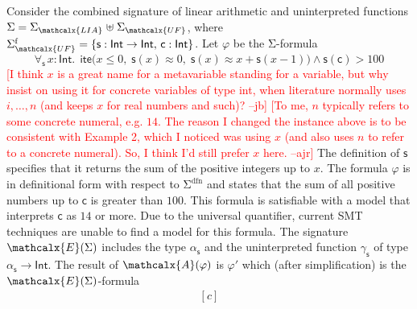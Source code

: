 \documentclass[runningheads,a4paper]{llncs}
\newcommand{\con}[1]{\mathsf{#1}}
\let\const=\con
\let\oldSigma=\Sigma
\def\Sigma{\mathrm{\oldSigma}}
\let\oldwedge=\wedge
\def\wedge{\mathrel{\oldwedge}}
\newcommand{\teq}{\approx}
\newcommand{\conv}{\mathcalx{A}}
\newcommand{\stypes}[1]{#1^\mathrm{ty}}
\newcommand{\sfuns}[1]{#1^\mathrm{f}}
\newcommand{\sfundefs}[1]{#1^\mathrm{dfn}}
\newcommand{\typeint}{\ty{Int}}
\newcommand\ty[1]{\con{#1}}
\newcommand{\lite}{\con{ite}}
\newcommand\concret{\gamma} %
\newcommand{\forallf}[1]{\forall_{\!#1\:}}
\newcommand{\farg}[1]{\concret_{#1}}
\newcommand{\fargtype}[1]{\alpha_{#1}}
\newcommand{\Sigmalia}{\Sigma_{\mathcalx{LIA}}}
\newcommand{\extendsig}[1]{\mathcalx{E}( #1 )}
\newcommand{\rem}[1]{\textcolor{red}{[#1]}}
\newcommand{\ajr}[1]{\rem{#1 --ajr}}
\newcommand{\jb}[1]{\rem{#1 --jb}}
\newcommand{\ct}[1]{\rem{#1 --ct}}
\newcommand{\euf}{\ensuremath{\mathcalx{UF}}\xspace}
\begin{document}
\begin{example}
\label{ex:translation}
Consider the combined signature of linear arithmetic and uninterpreted
functions $\Sigma = \Sigmalia \mathrel{\uplus} \Sigma_{\euf}$, where
$\sfuns{\Sigma_{\euf}} = \{ \con{s} : { \typeint \rightarrow \typeint },\, \const{c} : { \typeint } \}$.
Let $\varphi$ be the $\Sigma$-formula
\begin{equation} \label{eq:ex-before}
\forallf{\con{s}} x : {\typeint}.\;\, \lite\bigl( x \leq 0,\; \con{s}(x) \teq 0,\;
  \con{s}( x ) \teq x + \con{s}( x - 1 ) \bigr) \wedge \con{s}( \con{c} ) > 100
\end{equation}
%
\jb{I think $x$ is a great name for a metavariable standing for a variable, but
why insist on using it for concrete variables of type int, when literature
normally uses $i, \ldots, n$ (and keeps $x$ for real numbers and such)?}
\ajr{To me, $n$ typically refers to some concrete numeral, e.g. $14$.  The reason I changed the instance above is to be consistent with Example 2, which I noticed was using $x$ (and also uses $n$ to refer to a concrete numeral). So, I think I'd still prefer $x$ here.}
The definition of $\const{s}$ specifies that it returns the sum of the
positive integers up to $x$. The formula $\varphi$ is in definitional form with
respect to $\sfundefs{\Sigma}$ 
and states that the sum of all
positive numbers up to $\const{c}$ is greater than $100$. This formula is
satisfiable with a model that interprets $\const{c}$ as $14$ or more.
Due to the universal quantifier,
current SMT techniques
are unable to find
a model for this formula. The signature $\extendsig{\Sigma}$ includes the type
$\fargtype{\con{s}}$ and the uninterpreted function $\farg{\con{s}}$ of type $\fargtype{\con{s}}
\rightarrow \typeint$. The result of $\conv( \varphi )$ 
is $\varphi'$ which (after simplification) is the $\extendsig{\Sigma}$-formula
%
\begin{equation} \label{eq:ex-after}
\!\begin{aligned}[c]

\end{aligned}
\end{equation}
\end{example}
\end{document}
